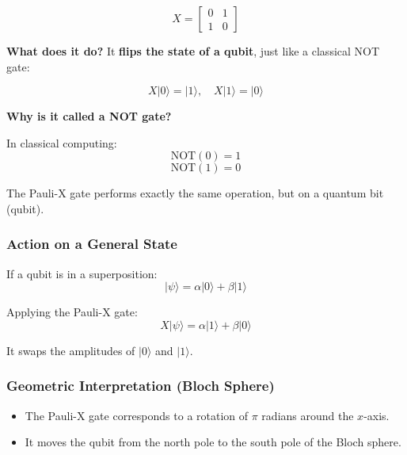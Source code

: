 \begin{equation}
X =
\begin{bmatrix}
0 & 1 \\
1 & 0
\end{bmatrix}
\end{equation}

\textbf{What does it do?} It \textbf{flips the state of a qubit}, just like a classical NOT gate:

\begin{equation}
X|0\rangle = |1\rangle, \quad X|1\rangle = |0\rangle
\end{equation}

\textbf{Why is it called a NOT gate?}

In classical computing:
\[
\text{NOT}(0) = 1
\]
\[
\text{NOT}(1) = 0
\]

The Pauli-X gate performs exactly the same operation, but on a quantum bit (qubit).

\subsubsection{Action on a General State}

If a qubit is in a superposition:
\[
|\psi\rangle = \alpha |0\rangle + \beta |1\rangle
\]

Applying the Pauli-X gate:
\[
X|\psi\rangle = \alpha |1\rangle + \beta |0\rangle
\]

It swaps the amplitudes of $|0\rangle$ and $|1\rangle$.

\subsubsection{Geometric Interpretation (Bloch Sphere)}

\begin{itemize}
\item The Pauli-X gate corresponds to a rotation of $\pi$ radians around the $x$-axis.
\item It moves the qubit from the north pole to the south pole of the Bloch sphere.
\end{itemize}

